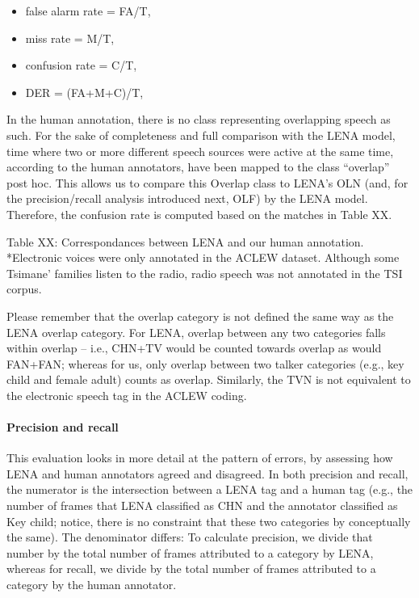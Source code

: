 \documentclass[english,floatsintext,man]{apa6}
\providecommand{\tightlist}{%
  \setlength{\itemsep}{0pt}\setlength{\parskip}{0pt}}
\begin{document}
\begin{itemize}
\tightlist
\item
  false alarm rate = FA/T,
\item
  miss rate = M/T,
\item
  confusion rate = C/T,
\item
  DER = (FA+M+C)/T,
\end{itemize}

In the human annotation, there is no class representing overlapping
speech as such. For the sake of completeness and full comparison with
the LENA model, time where two or more different speech sources were
active at the same time, according to the human annotators, have been
mapped to the class \enquote{overlap} post hoc. This allows us to
compare this Overlap class to LENA's OLN (and, for the precision/recall
analysis introduced next, OLF) by the LENA model. Therefore, the
confusion rate is computed based on the matches in Table XX.

Table XX: Correspondances between LENA and our human annotation.
*Electronic voices were only annotated in the ACLEW dataset. Although
some Tsimane' families listen to the radio, radio speech was not
annotated in the TSI corpus.

Please remember that the overlap category is not defined the same way as
the LENA overlap category. For LENA, overlap between any two categories
falls within overlap -- i.e., CHN+TV would be counted towards overlap as
would FAN+FAN; whereas for us, only overlap between two talker
categories (e.g., key child and female adult) counts as overlap.
Similarly, the TVN is not equivalent to the electronic speech tag in the
ACLEW coding.

\paragraph{Precision and recall}\label{precision-and-recall}

This evaluation looks in more detail at the pattern of errors, by
assessing how LENA and human annotators agreed and disagreed. In both
precision and recall, the numerator is the intersection between a LENA
tag and a human tag (e.g., the number of frames that LENA classified as
CHN and the annotator classified as Key child; notice, there is no
constraint that these two categories by conceptually the same). The
denominator differs: To calculate precision, we divide that number by
the total number of frames attributed to a category by LENA, whereas for
recall, we divide by the total number of frames attributed to a category
by the human annotator.
\end{document}
